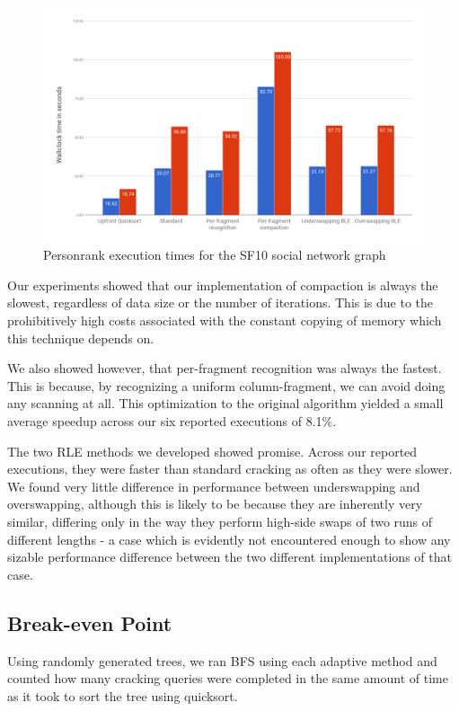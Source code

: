 \begin{figure}[H]
  \centering
  \includegraphics[width=\textwidth]{images/personrankSF10}
  \caption{Personrank execution times for the SF10 social network graph}
  \label{fig:personranksf10}
\end{figure}

Our experiments showed that our implementation of compaction is always the slowest, regardless of data size or the number of iterations. This is due to the prohibitively high costs associated with the constant copying of memory which this technique depends on.

We also showed however, that per-fragment recognition was always the fastest. This is because, by recognizing a uniform column-fragment, we can avoid doing any scanning at all. This optimization to the original algorithm yielded a small average speedup across our six reported executions of 8.1$\%$.

The two RLE methods we developed showed promise. Across our reported executions, they were faster than standard cracking as often as they were slower. We found very little difference in performance between underswapping and overswapping, although this is likely to be because they are inherently very similar, differing only in the way they perform high-side swaps of two runs of different lengths - a case which is evidently not encountered enough to show any sizable performance difference between the two different implementations of that case.

\subsection{Break-even Point}

Using randomly generated trees, we ran BFS using each adaptive method and counted how many cracking queries were completed in the same amount of time as it took to sort the tree using quicksort.

